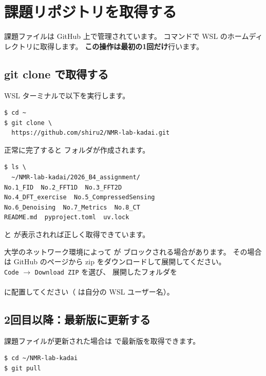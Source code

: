 \chapter{課題リポジトリを取得する}

課題ファイルは GitHub 上で管理されています。
 コマンドで WSL のホームディレクトリに取得します。
\textbf{この操作は最初の1回だけ}行います。

\section{git clone で取得する}

WSL ターミナルで以下を実行します。

\begin{wslbox}[リポジトリのクローン]
\begin{lstlisting}[style=bash]
$ cd ~
$ git clone \
  https://github.com/shiru2/NMR-lab-kadai.git
\end{lstlisting}
\end{wslbox}

正常に完了すると  フォルダが作成されます。

\begin{wslbox}[取得の確認]
\begin{lstlisting}[style=bash]
$ ls \
  ~/NMR-lab-kadai/2026_B4_assignment/
No.1_FID  No.2_FFT1D  No.3_FFT2D
No.4_DFT_exercise  No.5_CompressedSensing
No.6_Denoising  No.7_Metrics  No.8_CT
README.md  pyproject.toml  uv.lock
\end{lstlisting}
\end{wslbox}

 と  が表示されれば正しく取得できています。

\begin{notebox}
大学のネットワーク環境によって  が
ブロックされる場合があります。
その場合は GitHub のページから zip をダウンロードして展開してください。\\[0.5em]
\texttt{Code} $\rightarrow$ \texttt{Download ZIP} を選び、
展開したフォルダを\\
\\
に配置してください（ は自分の WSL ユーザー名）。
\end{notebox}

\section{2回目以降：最新版に更新する}

課題ファイルが更新された場合は  で最新版を取得できます。

\begin{wslbox}[最新版に更新]
\begin{lstlisting}[style=bash]
$ cd ~/NMR-lab-kadai
$ git pull
\end{lstlisting}
\end{wslbox}
